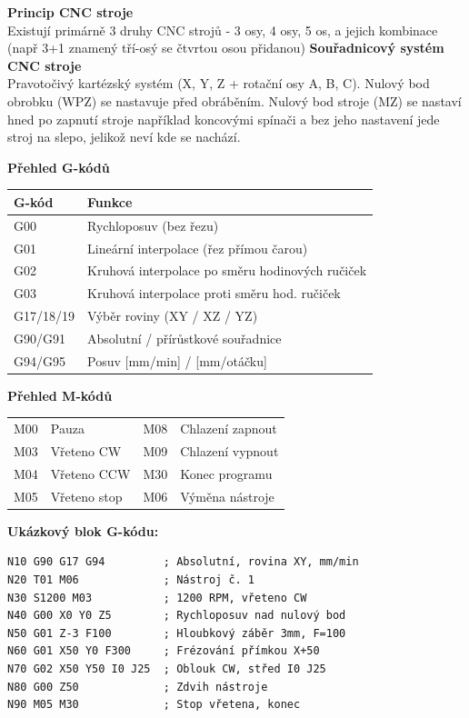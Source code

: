 \documentclass[a4paper,10pt]{article}
\begin{document}
\begin{vysvetlenibox}
\textbf{Princip CNC stroje}\\
Existují primárně 3 druhy CNC strojů - 3 osy, 4 osy, 5 os, a jejich kombinace (např 3+1 znamený tří-osý se čtvrtou osou přidanou)
\textbf{Souřadnicový systém CNC stroje}\\
Pravotočivý kartézský systém (X, Y, Z + rotační osy A, B, C).
Nulový bod obrobku (WPZ) se nastavuje před obráběním. Nulový bod stroje (MZ) se nastaví hned po zapnutí stroje například koncovými spínači a bez jeho nastavení jede stroj na slepo, jelikož neví kde se nachází.

\textbf{Přehled G-kódů}

\begin{center}
\begin{tabularx}{0.95\linewidth}{@{} l X @{}}
    \toprule
    \textbf{G-kód} & \textbf{Funkce} \\
    \midrule
    G00 & Rychloposuv (bez řezu) \\
    G01 & Lineární interpolace (řez přímou čarou) \\
    G02 & Kruhová interpolace po směru hodinových ručiček \\
    G03 & Kruhová interpolace proti směru hod. ručiček \\
    G17/18/19 & Výběr roviny (XY / XZ / YZ) \\
    G90/G91 & Absolutní / přírůstkové souřadnice \\
    G94/G95 & Posuv [mm/min] / [mm/otáčku] \\
    \bottomrule
\end{tabularx}
\end{center}

\textbf{Přehled M-kódů}

\begin{center}
\begin{tabular}{@{} l l @{\quad} l l @{}}
    \toprule
    M00 & Pauza & M08 & Chlazení zapnout \\
    M03 & Vřeteno CW & M09 & Chlazení vypnout \\
    M04 & Vřeteno CCW & M30 & Konec programu \\
    M05 & Vřeteno stop & M06 & Výměna nástroje \\
    \bottomrule
\end{tabular}
\end{center}

\textbf{Ukázkový blok G-kódu:}
\begin{vzorcebox}
\begin{verbatim}
N10 G90 G17 G94         ; Absolutní, rovina XY, mm/min
N20 T01 M06             ; Nástroj č. 1
N30 S1200 M03           ; 1200 RPM, vřeteno CW
N40 G00 X0 Y0 Z5        ; Rychloposuv nad nulový bod
N50 G01 Z-3 F100        ; Hloubkový záběr 3mm, F=100
N60 G01 X50 Y0 F300     ; Frézování přímkou X+50
N70 G02 X50 Y50 I0 J25  ; Oblouk CW, střed I0 J25
N80 G00 Z50             ; Zdvih nástroje
N90 M05 M30             ; Stop vřetena, konec
\end{verbatim}
\end{vzorcebox}


\end{vysvetlenibox}
\end{document}
